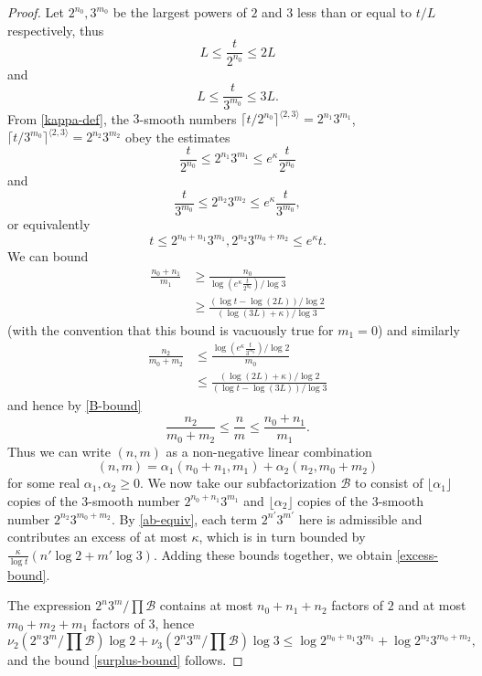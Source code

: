 \documentclass[12pt,a4paper,reqno]{amsart}
\numberwithin{equation}{section}
\theoremstyle{plain}
\theoremstyle{definition}
\newcommand\tuple{{\mathcal B}}
\begin{document}
\begin{proof}  Let $2^{n_0}, 3^{m_0}$ be the largest powers of $2$ and $3$ less than or equal to $t/L$ respectively, thus
  $$ L \leq \frac{t}{2^{n_0}} \leq 2L$$
  and
  $$ L \leq \frac{t}{3^{m_0}} \leq 3L.$$
From \eqref{kappa-def}, the $3$-smooth numbers $\lceil t/2^{n_0} \rceil^{\langle 2,3 \rangle} = 2^{n_1} 3^{m_1} $, $\lceil t/3^{m_0} \rceil^{\langle 2,3 \rangle} = 2^{n_2} 3^{m_2}$ obey the estimates
\begin{equation}\label{ab} 
  \frac{t}{2^{n_0}} \leq 2^{n_1} 3^{m_1} \leq e^{\kappa} \frac{t}{2^{n_0}}
\end{equation}
and
\begin{equation}\label{ab-2}
 \frac{t}{3^{m_0}} \leq 2^{n_2} 3^{m_2} \leq e^{\kappa} \frac{t}{3^{m_0}},
\end{equation}
or equivalently
\begin{equation}\label{ab-equiv} 
  t \leq 2^{n_0+n_1} 3^{m_1}, 2^{n_2} 3^{m_0+m_2} \leq e^{\kappa} t.
\end{equation}
We can bound
\begin{align*}
  \frac{n_0 + n_1}{m_1} &\geq \frac{n_0}{\log (e^{\kappa} \frac{t}{2^{n_0}}) / \log 3} \\
  &\geq \frac{(\log t - \log(2L)) / \log 2}{ (\log(3L)+\kappa) / \log 3 }
\end{align*}
(with the convention that this bound is vacuously true for $m_1=0$) and similarly
\begin{align*}
  \frac{n_2}{m_0+m_2} &\leq \frac{\log(e^\kappa \frac{t}{3^{m_0}}) / \log 2}{m_0} \\
  &\leq \frac{(\log(2L)+\kappa)/\log 2}{(\log t-\log(3L))/\log 3}
\end{align*}
and hence by \eqref{B-bound}
\begin{equation}\label{m-wedge} \frac{n_2}{m_0+m_2} \leq \frac{n}{m} \leq \frac{n_0+n_1}{m_1}.
\end{equation}
Thus we can write $(n,m)$ as a non-negative linear combination
$$ (n,m) = \alpha_1 (n_0+n_1,m_1) + \alpha_2 (n_2,m_0+m_2)$$
for some real $\alpha_1, \alpha_2 \geq 0$. We now take our subfactorization $\tuple$ to consist of $\lfloor \alpha_1 \rfloor$ copies of the $3$-smooth number $2^{n_0+n_1} 3^{m_1}$ and $\lfloor \alpha_2 \rfloor$ copies of the $3$-smooth number $2^{n_2} 3^{m_0+m_2}$.  By \eqref{ab-equiv}, each term $2^{n'} 3^{m'}$ here is admissible and contributes an excess of at most $\kappa$, which is in turn bounded by $\frac{\kappa}{\log t} (n' \log 2 + m' \log 3)$.  Adding these bounds together, we obtain \eqref{excess-bound}.

The expression $2^n 3^m / \prod \tuple$ contains at most $n_0+n_1+n_2$ factors of $2$ and at most $m_0+m_2+m_1$ factors of $3$, hence
$$ \nu_2(2^n 3^m / \prod \tuple) \log 2 +
\nu_3(2^n 3^m / \prod \tuple) \log 3
\leq \log 2^{n_0+n_1} 3^{m_1} + \log 2^{n_2} 3^{m_0+m_2},$$
and the bound \eqref{surplus-bound} follows.
\end{proof}
\end{document}
